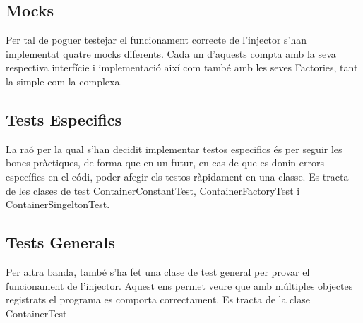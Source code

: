 
\subsection{Mocks}
Per tal de poguer testejar el funcionament correcte de l'injector s'han implementat quatre mocks diferents. Cada un d'aquests compta amb la seva respectiva interfície i implementació així com també amb les seves Factories, tant la simple com la complexa.
\subsection{Tests Especifics}
La raó per la qual s'han decidit implementar testos especifics és per seguir les bones pràctiques, de forma que en un futur, en cas de que es donin errors específics en el códi, poder afegir els testos ràpidament en una classe. Es tracta de les clases de test ContainerConstantTest, ContainerFactoryTest i ContainerSingeltonTest.
\subsection{Tests Generals}
Per altra banda, també s'ha fet una clase de test general per provar el funcionament de l'injector. Aquest ens permet veure que amb múltiples objectes registrats el programa es comporta correctament. Es tracta de la clase ContainerTest

